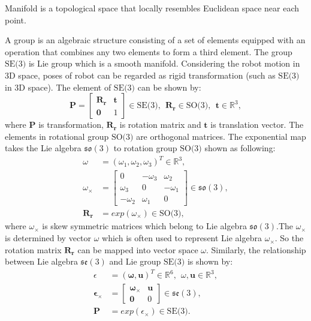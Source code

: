 \documentclass[journal]{IEEEtran}
\begin{document}
Manifold is a topological space that locally resembles Euclidean space near each point. 

A group is an algebraic structure consisting of a set of elements equipped with an operation that combines any two elements to form a third element. The group $\text{SE(3)}$ is Lie group \cite{Hertzberg:2008tx} which is a smooth manifold. Considering the robot motion in 3D space, poses of robot can be regarded as rigid transformation (such as $\text{SE(3)}$ in 3D space). The element of $\text{SE(3)}$ can be shown by: 
\begin{equation}\label{1}
\mathbf{P} = \left[\begin{array}{cc}
    \mathbf{R_r}  & \mathbf{t} \\
    \mathbf{0}  &  1 
    \end{array}\right] \in \text{SE(3)},\ \
    \mathbf{R_r} \in \text{SO(3)}, \ \ \mathbf{t} \in \mathbb{R}^{3},
\end{equation} 
where $\mathbf{P}$ is transformation, $\mathbf{R_r}$ is rotation matrix and $\mathbf{t}$ is translation vector. The elements in rotational group $\text{SO(3)}$ are orthogonal matrices. The exponential map takes the Lie algebra $\mathfrak{so}(3)$ to rotation group $\text{SO(3)}$ shown as following:
\begin{equation}\label{2}
\begin{array}{ll}
\omega &= (\omega_1,\omega_2,\omega_3)^{T} \in \mathbb{R}^{3},
\\
\omega_{\times} &= \left[\begin{array}{ccc}
    0  & -\omega_3 &\omega_2 \\
    \omega_3  &  0 & -\omega_1 \\
    -\omega_2 &\omega_1 &0 
    \end{array}\right] \in \mathfrak{so}(3),
\\
\mathbf{R_r} &= exp(\omega_{\times}) \in \text{SO(3)},
\end{array}
\end{equation}
where $\omega_{\times}$ is skew symmetric matrices which belong to Lie algebra $\mathfrak{so}(3)$.The $\omega_{\times}$ is determined by vector $\omega$ which is often used to represent Lie algebra $\omega_{\times}$. So the rotation matrix $\mathbf{R_r}$ can be mapped into vector space $\omega$. Similarly, the relationship between Lie algebra $\mathfrak{se}(3)$ and Lie group $\text{SE(3)}$ is shown by:  
\begin{equation}\label{5}
\begin{array}{ll}
\epsilon &= ( \mathbf{\omega},\mathbf{u})^{T} \in \mathbb{R}^6, \ \ \omega,\mathbf{u} \in \mathbb{R}^3,
\\
\mathbf{\epsilon_\times} &= \left[\begin{array}{cc}
    \mathbf{\omega_{\times}}  & \mathbf{u} \\
    \mathbf{0}  &  0 
    \end{array}\right]  \in \mathfrak{se}(3),
\\
\mathbf{P} &= exp(\epsilon_{\times}) \in \text{SE(3)}.
\end{array} 
\end{equation}
\end{document}
